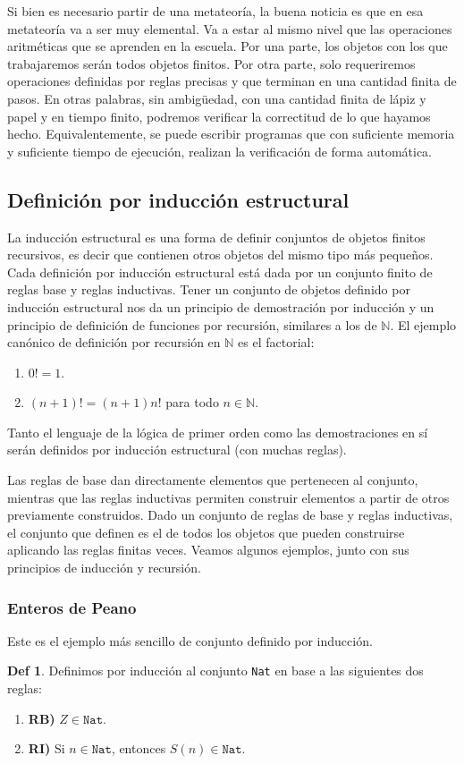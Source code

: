 \documentclass[a4paper, 12pt]{report}
\newcommand{\N}{\mathbb{N}}
\theoremstyle{definition}
\newtheorem*{definicion*}{Def}
\begin{document}
Si bien es necesario partir de una metateoría, la buena noticia es que en esa metateoría va a ser muy elemental. Va a estar al mismo nivel que las operaciones aritméticas que se aprenden en la escuela. Por una parte, los objetos con los que trabajaremos serán todos objetos finitos. Por otra parte, solo requeriremos operaciones definidas por reglas precisas y que terminan en una cantidad finita de pasos. En otras palabras, sin ambigüedad, con una cantidad finita de lápiz y papel y en tiempo finito, podremos verificar la correctitud de lo que hayamos hecho. Equivalentemente, se puede escribir programas que con suficiente memoria y suficiente tiempo de ejecución, realizan la verificación de forma automática.

\subsection{Definición por inducción estructural}\label{sec-IndEstr}

La inducción estructural es una forma de definir conjuntos de objetos finitos recursivos, es decir que contienen otros objetos del mismo tipo más pequeños. Cada definición por inducción estructural está dada por un conjunto finito de reglas base y reglas inductivas. Tener un conjunto de objetos definido por inducción estructural nos da un principio de demostración por inducción y un principio de definición de funciones por recursión, similares a los de $\N$. El ejemplo canónico de definición por recursión en $\N$ es el factorial:
\begin{enumerate}
	\item $0! = 1$.
	\item $(n+1)! = (n+1)n!$ para todo $n\in\N$.
\end{enumerate}

 Tanto el lenguaje de la lógica de primer orden como las demostraciones en sí serán definidos por inducción estructural (con muchas reglas).

Las reglas de base dan directamente elementos que pertenecen al conjunto, mientras que las reglas inductivas permiten construir elementos a partir de otros previamente construidos.
Dado un conjunto de reglas de base y reglas inductivas, el conjunto que definen es el de todos los objetos que pueden construirse aplicando las reglas finitas veces.
Veamos algunos ejemplos, junto con sus principios de inducción y recursión.

\subsubsection{Enteros de Peano}
Este es el ejemplo más sencillo de conjunto definido por inducción.
\begin{definicion*}
	Definimos por inducción al conjunto \texttt{Nat} en base a las siguientes dos reglas:
	\begin{enumerate}
		\item \textbf{RB)} $Z\in \mathtt{Nat}$.
		\item \textbf{RI)} Si $n\in\mathtt{Nat}$, entonces $S(n)\in\mathtt{Nat}$.
	\end{enumerate}
\end{definicion*}
\end{document}
